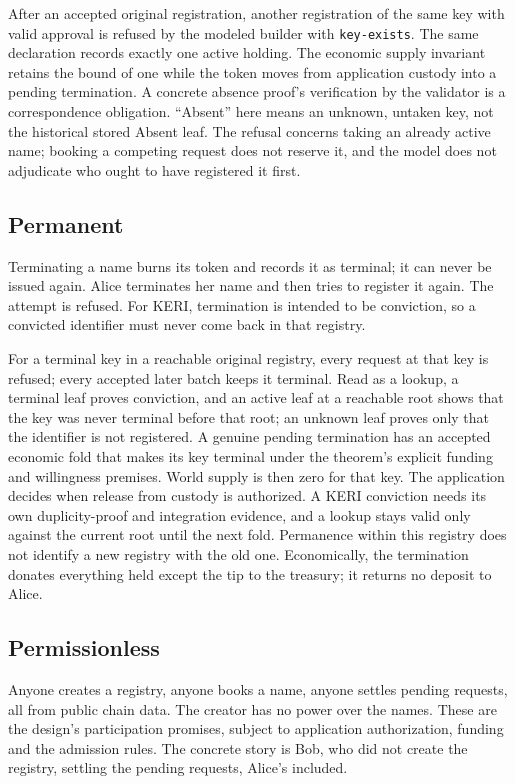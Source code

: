 \checked After an accepted original registration, another registration of
the same key with valid approval is refused by the modeled builder with
\texttt{key-exists}. The same declaration records exactly one active holding.
\checked The economic supply invariant retains the bound of one while the
token moves from application custody into a pending termination.
\missing A concrete absence proof's verification by the validator is a
correspondence obligation. ``Absent'' here means an unknown, untaken key,
not the historical stored Absent leaf. The refusal concerns taking an
already active name; booking a competing request does not reserve it, and
the model does not adjudicate who ought to have registered it first.

\subsection{Permanent}
Terminating a name burns its token and records it as terminal; it can never
be issued again. Alice terminates her name and then tries to register it
again. The attempt is refused. For KERI, termination is intended to be
conviction, so a convicted identifier must never come back in that registry.

\checked For a terminal key in a reachable original registry, every request
at that key is refused; every accepted later batch keeps it terminal.
\hand Read as a lookup, a terminal leaf proves conviction, and an active
leaf at a reachable root shows that the key was never terminal before that
root; an unknown leaf proves only that the identifier is not registered.
\checked A genuine pending termination has an accepted economic fold that
makes its key terminal under the theorem's explicit funding and willingness
premises. World supply is then zero for that key.
\missing The application decides when release from custody is authorized.
A KERI conviction needs its own duplicity-proof and integration evidence,
and a lookup stays valid only against the current root until the next fold.
Permanence within this registry does not identify a new registry with the old
one. Economically, the termination donates everything held except the tip
to the treasury; it returns no deposit to Alice.

\subsection{Permissionless}
Anyone creates a registry, anyone books a name, anyone settles pending
requests, all from public chain data. The creator has no power over the
names. These are the design's participation promises, subject to application
authorization, funding and the admission rules. The concrete story is Bob,
who did not create the registry, settling the pending requests, Alice's included.

